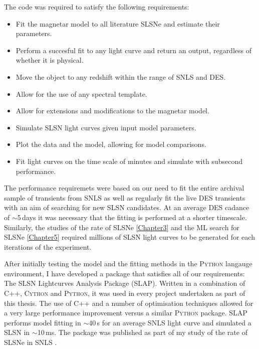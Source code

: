The code was required to satisfy the following requirements:
\begin{itemize}
  \item Fit the magnetar model to all literature SLSNe and estimate their parameters.
  \item Perform a succesful fit to any light curve and return an output, regardless of whether it is physical.
  \item Move the object to any redshift within the range of SNLS and DES.
  \item Allow for the use of any spectral template.
  \item Allow for extensions and modifications to the magnetar model.
  \item Simulate SLSN light curves given input model parameters.
  \item Plot the data and the model, allowing for model comparisons.
  \item Fit light curves on the time scale of minutes and simulate with subsecond performance.
\end{itemize}

The performance requiremets were based on our need to fit the entire archival sample of transients from SNLS as well as regularly fit the live DES transients with an aim of searching for new SLSN candidates. At an average DES cadance of $\sim$5\,days it was necessary that the fitting is performed at a shorter timescale. Similarly, the studies of the rate of SLSNe \cref{Chapter3} and the ML search for SLSNe \cref{Chapter5} required millions of SLSN light curves to be generated for each iterations of the experiment.

After initially testing the model and the fitting methods in the \textsc{Python} langauge environment, I have developed a package that satisfies all of our requirements: The SLSN Lightcurves Analysis Package (SLAP). Written in a combination of \textsc{C++}, \textsc{Cython} and \textsc{Python}, it was used in every project undertaken as part of this thesis. The use of C++ and a number of optimisation techniques allowed for a very large performance improvement versus a similar \textsc{Python} package. \textsc{SLAP} performs model fitting in $\sim$40\,s for an average SNLS light curve and simulated a SLSN in $\sim$10\,ms. The package was published as part of my study of the rate of SLSNe in SNLS \citep{Prajs2016}.

